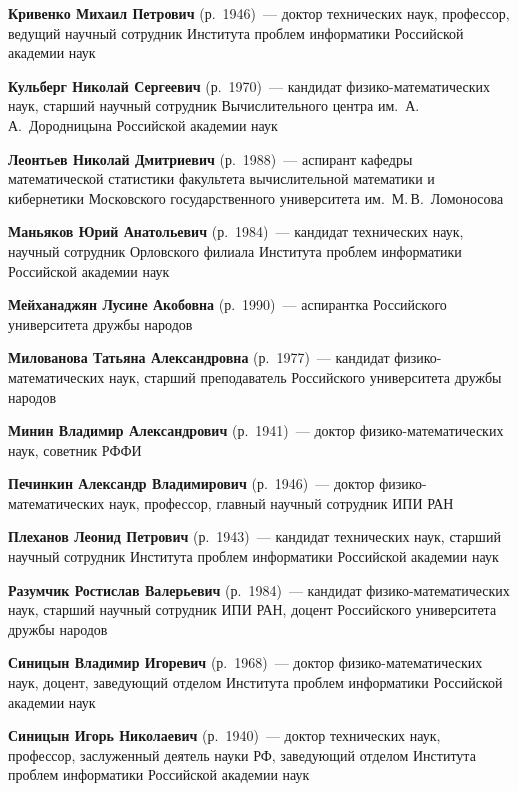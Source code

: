 \begin{multicols}{2}
\noindent
\textbf{Кривенко Михаил Петрович} (р.\ 1946)~---
доктор технических наук, профессор, ведущий научный сотрудник Института проблем информатики Российской академии наук

\noindent
\textbf{Кульберг Николай Сергеевич} (р.\ 1970)~---
кандидат фи\-зи\-ко-ма\-те\-ма\-ти\-че\-ских наук, старший научный сотрудник Вычислительного центра им.\ А.\,А.~Дородницына Российской академии наук

\noindent
\textbf{Леонтьев Николай Дмитриевич} (р.\ 1988)~---
аспирант кафедры математической статистики факультета вычислительной математики и кибернетики Московского государственного университета им.\ М.\,В.~Ломоносова

\noindent
\textbf{Маньяков Юрий Анатольевич} (р.\ 1984)~---
  кандидат технических наук, научный сотрудник Орловского филиала Института проблем информатики Российской академии наук

\noindent
\textbf{Мейханаджян Лусине Акобовна} (р.\ 1990)~--- аспирантка
Российского университета дружбы народов

\noindent
\textbf{Милованова Татьяна Александровна} (р.\ 1977)~---
кандидат фи\-зи\-ко-ма\-те\-ма\-ти\-че\-ских наук, старший преподаватель
Российского университета дружбы народов

\noindent
\textbf{Минин Владимир Александрович} (р.\ 1941)~---
доктор фи\-зи\-ко-ма\-те\-ма\-ти\-че\-ских наук, советник РФФИ

\noindent
\textbf{Печинкин Александр Владимирович} (р.\ 1946)~---
доктор фи\-зи\-ко-ма\-те\-ма\-ти\-че\-ских наук, профессор,
главный научный сотрудник ИПИ РАН

\noindent
\textbf{Плеханов Леонид Петрович} (р.\ 1943)~---
кандидат технических наук, старший научный сотрудник Института проблем информатики Российской академии наук


\noindent
\textbf{Разумчик Ростислав Валерьевич} (р.\ 1984)~---
кандидат фи\-зи\-ко-ма\-те\-ма\-ти\-че\-ских наук,
старший научный сотрудник ИПИ РАН, доцент
Российского университета дружбы народов

\noindent
\textbf{Синицын Владимир Игоревич} (р.\ 1968)~---
доктор фи\-зи\-ко-ма\-те\-ма\-ти\-че\-ских наук, доцент, заведующий отделом
Института проб\-лем информатики
Российской академии наук

\noindent
\textbf{Синицын Игорь Николаевич} (р.\ 1940)~---
доктор технических наук,
профессор, заслуженный деятель науки РФ, заведующий отделом Института проб\-лем информатики
Российской академии наук



\end{multicols}
